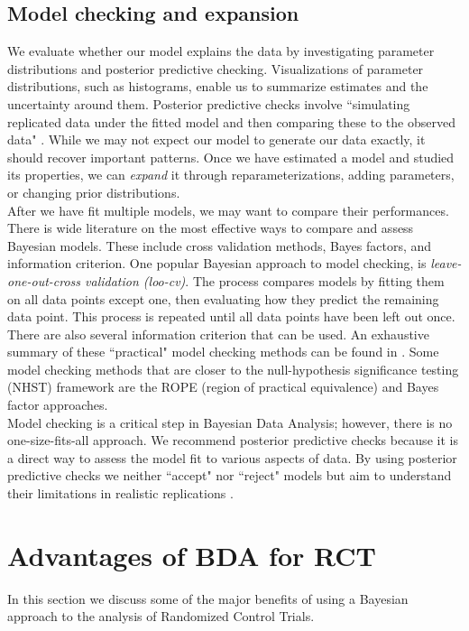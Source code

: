 \documentclass{article}
\begin{document}
\subsection{Model checking and expansion}
We evaluate whether our model explains the data by investigating parameter distributions and posterior predictive checking.  Visualizations of parameter distributions, such as histograms, enable us to summarize estimates and the uncertainty around them.  Posterior predictive checks involve ``simulating replicated data under the fitted model and then comparing these to the observed data" \cite[p. ~158]{gelman2006data}.  While we may not expect our model to generate our data exactly, it should recover important patterns.  Once we have estimated a model and studied its properties, we can \emph{expand} it through reparameterizations, adding parameters, or changing prior distributions. \\
After we have fit multiple models, we may want to compare their performances. There is wide literature on the most effective ways to compare and assess Bayesian models. These include cross validation methods, Bayes factors, and information criterion. One popular Bayesian approach to model checking, is \textit{leave-one-out-cross validation (loo-cv)}. The process compares models by fitting them on all data points except one, then evaluating how they predict the remaining data point. This process is repeated until all data points have been left out once. There are also several information criterion that can be used. An exhaustive summary of these ``practical" model checking methods can be found in . Some model checking methods that are closer to the null-hypothesis significance testing (NHST) framework are the ROPE (region of practical equivalence)\cite{kruschke2014doing} and Bayes factor \cite{rouder2009bayesian} approaches. \\
Model checking is a critical step in Bayesian Data Analysis; however, there is no one-size-fits-all approach.  We recommend posterior predictive checks because it is a direct way to assess the model fit to various aspects of data. By using posterior predictive checks we neither ``accept" nor ``reject" models but aim to understand their limitations in realistic replications \cite{gelman2014bayesian} .

\section{Advantages of BDA for RCT}
In this section we discuss some of the major benefits of using a Bayesian approach to the analysis of Randomized Control Trials.
\end{document}
